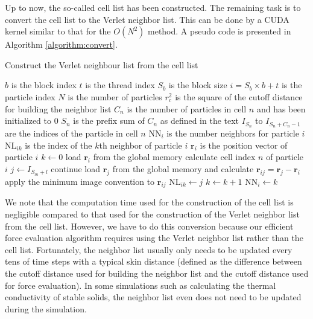 \documentclass[12pt,a4paper]{report}
\newcommand{\vect}[1]{\boldsymbol{#1}}
\begin{document}
Up to now, the so-called cell list has been constructed. The remaining task is to convert the cell list to the Verlet neighbor list. This can be done by a CUDA kernel similar to that for the $O(N^2)$ method. A pseudo code is presented in Algorithm \ref{algorithm:convert}.

\begin{algorithm}[htb]
\caption{Construct the Verlet neighbour list from the cell list}
\label{algorithm:convert}
\begin{algorithmic}[1]
\Require $b$ is the block index
\Require $t$ is the thread index
\Require $S_b$ is the block size
\Require $i=S_b\times b+t$ is the particle index
\Require $N$ is the number of particles
\Require $r_c^2$ is the square of the cutoff distance for building the neighbor list
\Require $C_n$ is the number of particles in cell $n$ and has been initialized to 0
\Require $S_n$ is the prefix sum of $C_n$ as defined in the text
\Require $I_{S_n}$ to $I_{S_n + C_n - 1}$ are the indices of the particle in cell $n$
\Require NN$_{i}$ is the number neighbors for particle $i$
\Require NL$_{ik}$ is the index of the $k$th neighbor of particle $i$
\Require $\vect{r}_{i}$ is the position vector of particle $i$
\State $k\leftarrow 0$
    \State load $\vect{r}_{i}$ from the global memory
    \State calculate cell index $n$ of particle $i$
            \State $j \leftarrow I_{S_m + l} $
                \State continue
            \EndIf
            \State load $\vect{r}_{j}$ from the global memory and calculate
               $\vect{r}_{ij} = \vect{r}_{j} - \vect{r}_{i}$
            \State apply the minimum image convention to $\vect{r}_{ij}$
            \If {$|\vect{r}_{ij}|^2 < r_c^2$}
                \State NL$_{ik}\leftarrow j$
                \State $k\leftarrow k+1$
            \EndIf
        \EndFor
        \State NN$_{i}\leftarrow k$
    \EndFor
\EndIf
 \end{algorithmic}
\end{algorithm}

We note that the computation time used for the construction of the cell list is negligible compared to that used for the construction of the Verlet neighbor list from the cell list. However, we have to do this conversion because our efficient force evaluation algorithm \cite{fan2017cpc} requires using the Verlet neighbor list rather than the cell list. Fortunately, the neighbor list usually only needs to be updated every tens of time steps with a typical skin distance (defined as the difference between the cutoff distance used for building the neighbor list and the cutoff distance used for force evaluation). In some simulations such as calculating the thermal conductivity of stable solids, the neighbor list even does not need to be updated during the simulation.
\end{document}

